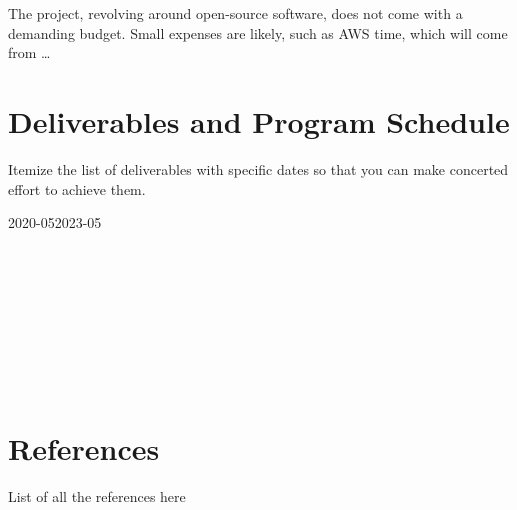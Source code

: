 \documentclass[a4paper,10pt]{article}
\begin{document}
The project, revolving around open-source software, does not come with a demanding budget.
Small expenses are likely, such as AWS time, which will come from  \dots

 
\section{Deliverables and Program Schedule}
Itemize the list of deliverables with specific dates so that you can make
concerted effort to achieve them.

\begin{ganttchart}[
		vgrid,
		x unit=0.3cm,
		time slot format=isodate-yearmonth,
		time slot unit=month]{2020-05}{2023-05}
	 \\
	 \\

	 \\
	 \\
	 \\

	 \\
	 \\
	 \\

	 \\

\end{ganttchart}

\section{References}
List of all the references here
\printbibliography
\end{document}
